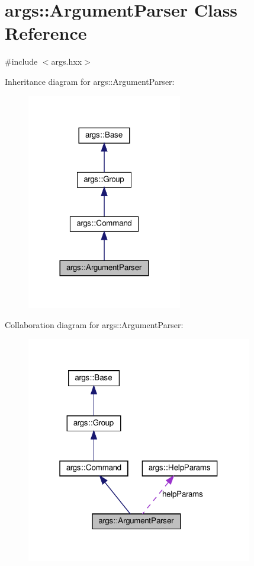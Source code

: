 \hypertarget{classargs_1_1_argument_parser}{}\section{args\+:\+:Argument\+Parser Class Reference}
\label{classargs_1_1_argument_parser}


{\ttfamily \#include $<$args.\+hxx$>$}



Inheritance diagram for args\+:\+:Argument\+Parser\+:\nopagebreak
\begin{figure}[H]
\begin{center}
\leavevmode
\includegraphics[width=192pt]{classargs_1_1_argument_parser__inherit__graph}
\end{center}
\end{figure}


Collaboration diagram for args\+:\+:Argument\+Parser\+:\nopagebreak
\begin{figure}[H]
\begin{center}
\leavevmode
\includegraphics[width=280pt]{classargs_1_1_argument_parser__coll__graph}
\end{center}
\end{figure}
